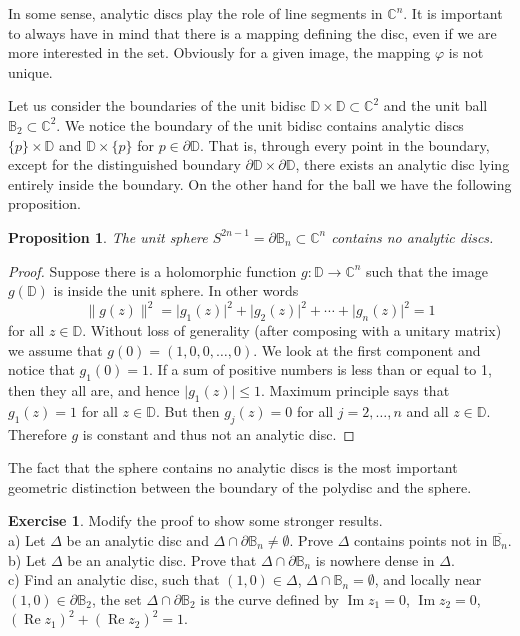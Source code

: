 \documentclass[12pt,openany]{book}
\renewcommand{\Re}{\operatorname{Re}}
\renewcommand{\Im}{\operatorname{Im}}
\newcommand{\sabs}[1]{\lvert {#1} \rvert}
\newcommand{\snorm}[1]{\lVert {#1} \rVert}
\newcommand{\C}{{\mathbb{C}}}
\newcommand{\D}{{\mathbb{D}}}
\newcommand{\bB}{{\mathbb{B}}}
\newcommand{\bD}{{\mathbb{D}}}
\theoremstyle{plain}
\newtheorem{prop}[thm]{Proposition}
\theoremstyle{remark}
\theoremstyle{definition}
\newenvironment{exbox}{%
    \def\FrameCommand{\vrule width 1pt \relax\hspace {10pt}}%
    \MakeFramed {\advance \hsize -\width \FrameRestore }%
}{%
    \endMakeFramed
}
\theoremstyle{exercise}
\newtheorem{exercise}{Exercise}[section]
\theoremstyle{example}
\begin{document}
In some sense, analytic discs play the role of line segments in $\C^n$.  It
is important to always have in mind that there is a mapping defining the
disc, even if we are more interested in the set.  Obviously for a given
image, the mapping $\varphi$ is not unique.

Let us consider the boundaries of 
the unit bidisc $\bD \times \bD \subset \C^2$
and the unit ball $\bB_2 \subset \C^2$.  We notice the boundary
of the unit bidisc contains analytic discs $\{p\} \times \bD$
and $\bD \times \{p\}$ for $p \in \partial \bD$.  That is, through
every point in the boundary, except for the distinguished
boundary $\partial \D \times \partial \D$, there exists an analytic disc
lying entirely inside the boundary.  On the other hand for the ball
we have the following proposition.

\begin{prop}
The unit sphere $S^{2n-1} = \partial \bB_n \subset \C^n$ 
contains no analytic discs.
\end{prop}

\begin{proof}
Suppose there is a holomorphic function $g \colon \D \to \C^n$
such that the image $g(\D)$ is inside the unit sphere.  In other words
\begin{equation*}
\snorm{g(z)}^2 = \sabs{g_1(z)}^2 + \sabs{g_2(z)}^2 + \cdots + \sabs{g_n(z)}^2 = 1
\end{equation*}
for all $z \in \D$.  Without loss of generality (after composing with a
unitary matrix) we assume that
$g(0) = (1,0,0,\ldots,0)$.  We look at the first component
and notice that $g_1(0) = 1$.  If a sum of
positive numbers is less than or equal to 1,
then they all are, and hence $\sabs{g_1(z)} \leq 1$.  Maximum principle
says
that $g_1(z) = 1$ for all $z \in \D$.  But then $g_j(z) = 0$
for all $j=2,\ldots,n$ and all $z \in \D$.  Therefore $g$ is constant and
thus not an analytic disc.
\end{proof}

The fact that the sphere contains no analytic discs
is the most important geometric distinction between the boundary of
the polydisc and the sphere.

\begin{exbox}
\begin{exercise}
Modify the proof to show some stronger results.\\
a) Let $\Delta$ be an analytic disc
and $\Delta \cap \partial \bB_n \not= \emptyset$.
Prove $\Delta$ contains points not in
$\overline{\bB_n}$.\\
b) Let $\Delta$ be an analytic disc.
Prove that $\Delta \cap \partial \bB_n$ is nowhere dense in $\Delta$.\\
c) Find an analytic disc, such that $(1,0) \in \Delta$, $\Delta \cap \bB_n =
\emptyset$, and 
locally near
$(1,0) \in \partial \bB_2$, the set
$\Delta \cap \partial \bB_2$ is the
curve defined by $\Im z_1=0$, $\Im z_2=0$,
$(\Re z_1)^2+ (\Re z_2)^2 = 1$.
\end{exercise}
\end{exbox}
\end{document}
